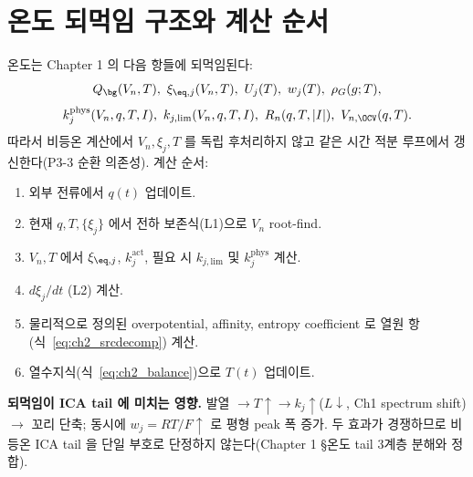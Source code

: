 \section{온도 되먹임 구조와 계산 순서}\label{sec:ch2_feedback}
온도는 Chapter 1 의 다음 항들에 되먹임된다:
\begin{equation}
Q_\bg(V_n,T),\ \xi_{\eq,j}(V_n,T),\ U_j(T),\ w_j(T),\ \rho_G(g;T),
\end{equation}
\begin{equation}
k_j^{\mathrm{phys}}(V_n,q,T,I),\ k_{j,\mathrm{lim}}(V_n,q,T,I),\ R_n(q,T,|I|),\ V_{n,\OCV}(q,T).
\end{equation}
따라서 비등온 계산에서 $V_n,\xi_j,T$ 를 독립 후처리하지 않고 같은 시간 적분 루프에서 갱신한다(P3-3 순환
의존성). 계산 순서:
\begin{enumerate}[label=\arabic*),leftmargin=2.0em]
\item 외부 전류에서 $q(t)$ 업데이트.
\item 현재 $q,T,\{\xi_j\}$ 에서 전하 보존식(L1)으로 $V_n$ root-find.
\item $V_n,T$ 에서 $\xi_{\eq,j}$, $k_j^{\mathrm{act}}$, 필요 시 $k_{j,\mathrm{lim}}$ 및 $k_j^{\mathrm{phys}}$ 계산.
\item $d\xi_j/dt$ (L2) 계산.
\item 물리적으로 정의된 overpotential, affinity, entropy coefficient 로 열원 항(식~\eqref{eq:ch2_srcdecomp}) 계산.
\item 열수지식(식~\eqref{eq:ch2_balance})으로 $T(t)$ 업데이트.
\end{enumerate}
\begin{boundbox}
\textbf{되먹임이 ICA tail 에 미치는 영향.} 발열 $\to T\uparrow\to k_j\uparrow$($L\downarrow$, Ch1 spectrum
shift) $\to$ 꼬리 단축; 동시에 $w_j=RT/F\uparrow$ 로 평형 peak 폭 증가. 두 효과가 경쟁하므로 비등온 ICA
tail 을 단일 부호로 단정하지 않는다(Chapter 1 \S 온도 tail 3계층 분해와 정합).
\end{boundbox}

